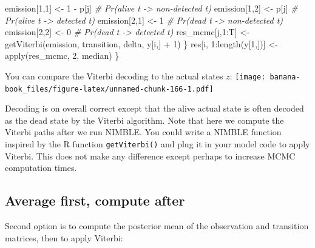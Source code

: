 \documentclass[
  12pt,
]{krantz}
\newenvironment{Shaded}{\begin{snugshade}}{\end{snugshade}}
\newcommand{\CommentTok}[1]{\textcolor[rgb]{0.56,0.35,0.01}{\textit{#1}}}
\newcommand{\DecValTok}[1]{\textcolor[rgb]{0.00,0.00,0.81}{#1}}
\newcommand{\FunctionTok}[1]{\textcolor[rgb]{0.00,0.00,0.00}{#1}}
\newcommand{\NormalTok}[1]{#1}
\newcommand{\OtherTok}[1]{\textcolor[rgb]{0.56,0.35,0.01}{#1}}
\newcommand{\SpecialCharTok}[1]{\textcolor[rgb]{0.00,0.00,0.00}{#1}}
\begin{document}
\begin{Shaded}
\begin{Highlighting}[]
\NormalTok{    emission[}\DecValTok{1}\NormalTok{,}\DecValTok{1}\NormalTok{] }\OtherTok{\textless{}{-}} \DecValTok{1} \SpecialCharTok{{-}}\NormalTok{ p[j]      }\CommentTok{\# Pr(alive t {-}\textgreater{} non{-}detected t)}
\NormalTok{    emission[}\DecValTok{1}\NormalTok{,}\DecValTok{2}\NormalTok{] }\OtherTok{\textless{}{-}}\NormalTok{ p[j]          }\CommentTok{\# Pr(alive t {-}\textgreater{} detected t)}
\NormalTok{    emission[}\DecValTok{2}\NormalTok{,}\DecValTok{1}\NormalTok{] }\OtherTok{\textless{}{-}} \DecValTok{1}          \CommentTok{\# Pr(dead t {-}\textgreater{} non{-}detected t)}
\NormalTok{    emission[}\DecValTok{2}\NormalTok{,}\DecValTok{2}\NormalTok{] }\OtherTok{\textless{}{-}} \DecValTok{0}          \CommentTok{\# Pr(dead t {-}\textgreater{} detected t)}
\NormalTok{    res\_mcmc[j,}\DecValTok{1}\SpecialCharTok{:}\NormalTok{T] }\OtherTok{\textless{}{-}} \FunctionTok{getViterbi}\NormalTok{(emission, transition, delta, y[i,] }\SpecialCharTok{+} \DecValTok{1}\NormalTok{)}
\NormalTok{  \}}
\NormalTok{  res[i, }\DecValTok{1}\SpecialCharTok{:}\FunctionTok{length}\NormalTok{(y[}\DecValTok{1}\NormalTok{,])] }\OtherTok{\textless{}{-}} \FunctionTok{apply}\NormalTok{(res\_mcmc, }\DecValTok{2}\NormalTok{, median)}
\NormalTok{\}}
\end{Highlighting}
\end{Shaded}

You can compare the Viterbi decoding to the actual states \(z\):
\texttt{[image: banana-book\_files/figure-latex/unnamed-chunk-166-1.pdf]}

Decoding is on overall correct except that the alive actual state is often decoded as the dead state by the Viterbi algorithm. Note that here we compute the Viterbi paths after we run NIMBLE. You could write a NIMBLE function inspired by the R function \texttt{getViterbi()} and plug it in your model code to apply Viterbi. This does not make any difference except perhaps to increase MCMC computation times.

\hypertarget{average-first-compute-after}{%
\subsection{Average first, compute after}\label{average-first-compute-after}}

Second option is to compute the posterior mean of the observation and transition matrices, then to apply Viterbi:
\end{document}
